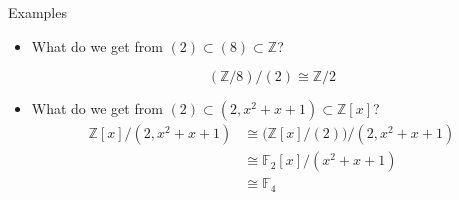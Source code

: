 \documentclass{beamer}
\newcommand{\Z}{\mathbb{Z}}
\begin{document}
\begin{frame}{Examples}

\begin{itemize}
\item What do we get from $(2)\subset (8)\subset \mathbb{Z}$? 

$$(\Z/8)/(2)\cong\Z/2$$
\item What do we get from $(2)\subset (2,x^2+x+1)\subset \Z[x]$?
\begin{align*}
\Z[x]/(2,x^2+x+1)& \cong \big(\Z[x]/(2)\big)/(2,x^2+x+1)\\
& \cong \mathbb{F}_2[x]/(x^2+x+1) \\
& \cong \mathbb{F}_4
\end{align*}
\end{itemize}
\end{frame}
\end{document}
